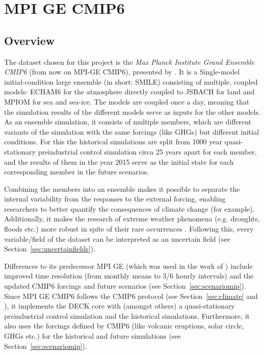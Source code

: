 \chapter{MPI GE CMIP6}
\label{ch:dataset}

\section{Overview}

The dataset chosen for this project is the \textit{Max Planck Institute Grand Ensemble CMIP6} (from now on MPI-GE CMIP6), presented by \citeauthor{olonscheck_new_2023}. 
It is a Single-model initial-condition large ensemble (in short: SMILE) consisting of multiple, coupled models: ECHAM6 for the atmosphere directly coupled to JSBACH for land and MPIOM for sea and sea-ice. 
The models are coupled once a day, meaning that the simulation results of the different models serve as inputs for the other models.
As an ensemble simulation, it consists of multiple members, which are different variants of the simulation with the same forcings (like GHGs) but different initial conditions. 
For this the historical simulations are split from 1000 year quasi-stationary preindustrial control simulation circa 25 years apart for each member, and the results of them in the year 2015 serve as the initial state for each corresponding member in the future scenarios. \cite{olonscheck_new_2023}

Combining the members into an ensemble makes it possible to separate the internal variability from the responses to the external forcing, enabling researchers to better quantify the consequences of climate change (for example). 
Additionally, it makes the research of extreme weather phenomena (e.g. droughts, floods etc.) more robust in spite of their rare occurrences \cite{maher_large_2021}. 
Following this, every variable/field of the dataset can be interpreted as an uncertain field (see Section~\ref{sec:uncertainfields}).

Differences to its predecessor MPI GE \cite{maher_max_2019} (which was used in the work of \citeauthor{vietinghoffdiss} \cite{vietinghoffdiss}) include improved time resolution (from monthly means to 3/6 hourly intervals) and the updated CMIP6 forcings and future scenarios (see Section~\ref{sec:scenariomip}). 
Since MPI GE CMIP6 follows the CMIP6 protocol (see Section~\ref{sec:climate} and \cite{eyring_overview_2016}), it implements the DECK core with (amongst others) a quasi-stationary preindustrial control simulation and the historical simulations.
Furthermore, it also uses the forcings defined by CMIP6 (like volcanic eruptions, solar circle, GHGs etc.) for the historical and future simulations (see Section~\ref{sec:scenariomip}).




